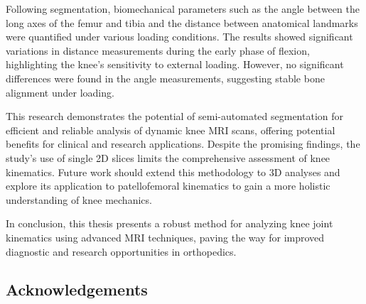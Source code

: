\documentclass{micro-econ-thesis}
\begin{document}
Following segmentation, biomechanical parameters such as the angle between the long axes of the femur and tibia and the distance between anatomical landmarks were quantified under various loading conditions. The results showed significant variations in distance measurements during the early phase of flexion, highlighting the knee's sensitivity to external loading. However, no significant differences were found in the angle measurements, suggesting stable bone alignment under loading.

This research demonstrates the potential of semi-automated segmentation for efficient and reliable analysis of dynamic knee MRI scans, offering potential benefits for clinical and research applications. Despite the promising findings, the study's use of single 2D slices limits the comprehensive assessment of knee kinematics. Future work should extend this methodology to 3D analyses and explore its application to patellofemoral kinematics to gain a more holistic understanding of knee mechanics.

In conclusion, this thesis presents a robust method for analyzing knee joint kinematics using advanced MRI techniques, paving the way for improved diagnostic and research opportunities in orthopedics.

\clearpage
\subsection*{Acknowledgements}


\cleardoublepage
\tableofcontents

\cleardoublepage
{}
{}
\listoffigures
\cleardoublepage
{}
{}
\listoftables

\cleardoublepage
{}
{}
\end{document}
